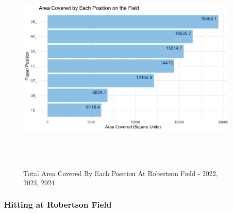 \documentclass{article}
\begin{document}
\begin{figure}[h]
    \centering
    \includegraphics[height=10cm]{images/area_covered.png}
    \caption{Total Area Covered By Each Position At Robertson Field - 2022, 2023, 2024}
    \cite{trackman2022} \cite{trackman2023} \cite{trackman2024}
\end{figure}


\newpage
\subsubsection{Hitting at Robertson Field}
\end{document}
